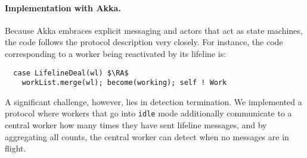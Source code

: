
\paragraph{Implementation with Akka.} Because Akka embraces explicit messaging
and actors that act as state machines, the code follows the protocol
description very closely. For instance, the code corresponding to a worker
being reactivated by its lifeline is:
\begin{lstlisting}
  case LifelineDeal(wl) $\RA$
    workList.merge(wl); become(working); self ! Work
\end{lstlisting}
A significant challenge, however, lies in detection termination. We implemented
a protocol where workers that go into \lstinline{idle} mode additionally
communicate to a central worker how many times they have sent lifeline
messages, and by aggregating all counts, the central worker can detect when no
messages are in flight.

% 
% 
% 
% 
% 
